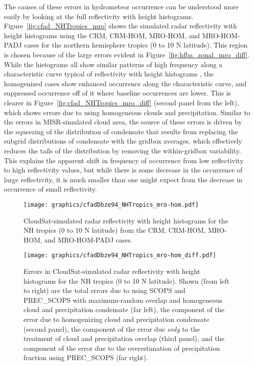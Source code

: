 The causes of these errors in hydrometeor occurrence can be understood
more easily by looking at the full reflectivity with height histograms.
Figure~\ref{fig:cfad_NHTropics_mro} shows the simulated radar
reflectivity with height histograms using the CRM, CRM-HOM, MRO-HOM, and
MRO-HOM-PADJ cases for the northern hemisphere tropics (0 to 10 N
latitude). This region is chosen because of the large errors evident in
Figure~\ref{fig:hfba_zonal_mro_diff}. While the histograms all show
similar patterns of high frequency along a characteristic curve typical
of reflectivity with height histograms
\citep[e.g.,][]{marchand_et_al_2009}, the homogenized cases show
enhanced occurrence along the characteristic curve, and suppressed
occurrence off of it where baseline occurrences are lower. This is
clearer in Figure~\ref{fig:cfad_NHTropics_mro_diff} (second panel from
the left), which shows errors due to using homogeneous clouds and
precipitation. Similar to the errors in MISR-simulated cloud area, the
source of these errors is driven by the squeezing of the distribution of
condensate that results from replacing the subgrid distributions of
condensate with the gridbox averages, which effectively reduces the
tails of the distribution by removing the within-gridbox variability.
This explains the apparent shift in frequency of occurrence from low
reflectivity to high reflectivity values, but while there is some
decrease in the occurrence of large reflectivity, it is much smaller
than one might expect from the decrease in occurrence of small
reflectivity.

\begin{figure}[tp]
\centering
\texttt{[image: graphics/cfadDbze94\_NHTropics\_mro-hom.pdf]}
\caption{\label{fig:cfad_NHTropics_mro}CloudSat-simulated radar
reflectivity with height histograms for the NH tropics (0 to 10 N
latitude) from the CRM, CRM-HOM, MRO-HOM, and MRO-HOM-PADJ
cases.}\label{fig:cfadux5fNHTropicsux5fmro}
\end{figure}

\begin{figure}[tp]
\centering
\texttt{[image: graphics/cfadDbze94\_NHTropics\_mro-hom\_diff.pdf]}
\caption{\label{fig:cfad_NHTropics_mro_diff}Errors in CloudSat-simulated
radar reflectivity with height histograms for the NH tropics (0 to 10 N
latitude). Shown (from left to right) are the total errors due to using
SCOPS and PREC\_SCOPS with maximum-random overlap and homogeneous cloud
and precipitation condensate (far left), the component of the error due
to homogenizing cloud and precipitation condensate (second panel), the
component of the error due \emph{only} to the treatment of cloud and
precipitation overlap (third panel), and the component of the error due
to the overestimation of precipitation fraction using PREC\_SCOPS (far
right).}\label{fig:cfadux5fNHTropicsux5fmroux5fdiff}
\end{figure}

